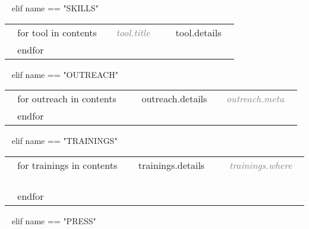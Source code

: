 \begin{minipage}{\textwidth}
%
 
~{ elif name == "SKILLS" }~

\begin{tabular}{ @{} p{} p{135mm} @{} }
  ~{ for tool in contents }~
  \small \textcolor{gray}{{\emph{~{{ tool.title }}~}}} & {\small ~{{ tool.details }}~} \\
  ~{ endfor }~
\end{tabular}

%

~{ elif name == "OUTREACH" }~

\begin{tabular}{ @{} p{} p{} @{} }
  ~{ for outreach in contents }~
  \small \textcolor{gray}{{\emph{ }}} & ~{{ outreach.details }}~ \small{\textcolor{gray}{{\emph{~{{ outreach.meta }}~}}}} \\
  ~{ endfor }~
\end{tabular}


~{ elif name == "TRAININGS" }~

\begin{tabular}{ @{} p{} p{} p{} @{} }
  ~{ for trainings in contents }~
  \small & {\small ~{{ trainings.details }}~} & \hfill {\small \textcolor{gray}{{\emph{~{{ trainings.where }}~}}}} \\
  ~{ endfor }~
\end{tabular}


~{ elif name == "PRESS" }~


\end{minipage}
